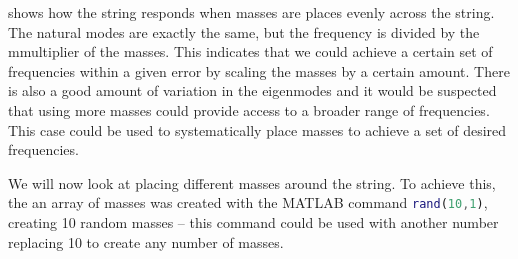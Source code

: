 \documentclass[10pt,a4paper]{article}
\begin{document}
\begin{multicols*}{2}
 shows how the string responds when masses are places evenly across the string. The natural modes are exactly the same, but the frequency is divided by the mmultiplier of the masses. This indicates that we could achieve a certain set of frequencies within a given error by scaling the masses by a certain amount. There is also a good amount of variation in the eigenmodes and it would be suspected that using more masses could provide access to a broader range of frequencies. This case could be used to systematically place masses to achieve a set of desired frequencies.

We will now look at placing different masses around the string. To achieve this, the an array of masses was created with the MATLAB command \lstinline[language=Matlab]|rand(10,1)|, creating 10 random masses -- this command could be used with another number replacing 10 to create any number of masses.


\end{multicols*}
\end{document}
